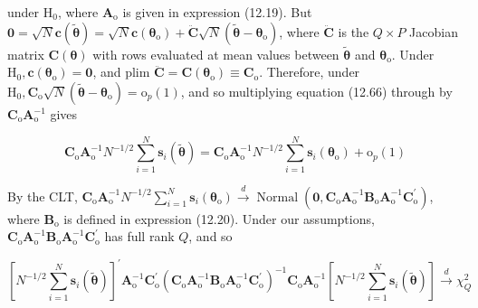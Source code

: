 \documentclass[10pt]{article}
\begin{document}
under $\mathrm{H}_{0}$, where $\mathbf{A}_{\mathrm{o}}$ is given in expression (12.19). But $\mathbf{0}=\sqrt{N} \mathbf{c}(\tilde{\boldsymbol{\theta}})=\sqrt{N} \mathbf{c}\left(\boldsymbol{\theta}_{\mathrm{o}}\right)+ \ddot{\mathbf{C}} \sqrt{N}\left(\tilde{\boldsymbol{\theta}}-\boldsymbol{\theta}_{\mathrm{o}}\right)$, where $\ddot{\mathbf{C}}$ is the $Q \times P$ Jacobian matrix $\mathbf{C}(\boldsymbol{\theta})$ with rows evaluated at mean values between $\tilde{\boldsymbol{\theta}}$ and $\boldsymbol{\theta}_{\mathrm{o}}$. Under $\mathrm{H}_{0}, \mathbf{c}\left(\boldsymbol{\theta}_{\mathrm{o}}\right)=\mathbf{0}$, and plim $\ddot{\mathbf{C}}=\mathbf{C}\left(\boldsymbol{\theta}_{\mathrm{o}}\right) \equiv \mathbf{C}_{\mathrm{o}}$. Therefore, under $\mathrm{H}_{0}, \mathbf{C}_{\mathrm{o}} \sqrt{N}\left(\tilde{\boldsymbol{\theta}}-\boldsymbol{\theta}_{\mathrm{o}}\right)=\mathrm{o}_{p}(1)$, and so multiplying equation (12.66) through by $\mathbf{C}_{\mathrm{o}} \mathbf{A}_{\mathrm{o}}^{-1}$ gives


\begin{equation*}
\mathbf{C}_{\mathrm{o}} \mathbf{A}_{\mathrm{o}}^{-1} N^{-1 / 2} \sum_{i=1}^{N} \mathbf{s}_{i}(\tilde{\boldsymbol{\theta}})=\mathbf{C}_{\mathrm{o}} \mathbf{A}_{\mathrm{o}}^{-1} N^{-1 / 2} \sum_{i=1}^{N} \mathbf{s}_{i}\left(\boldsymbol{\theta}_{\mathrm{o}}\right)+\mathrm{o}_{p}(1) \tag{12.67}
\end{equation*}


By the CLT, $\mathbf{C}_{\mathrm{o}} \mathbf{A}_{\mathrm{o}}^{-1} N^{-1 / 2} \sum_{i=1}^{N} \mathbf{s}_{i}\left(\boldsymbol{\theta}_{\mathrm{o}}\right) \xrightarrow{d} \operatorname{Normal}\left(\mathbf{0}, \mathbf{C}_{\mathrm{o}} \mathbf{A}_{\mathrm{o}}^{-1} \mathbf{B}_{\mathrm{o}} \mathbf{A}_{\mathrm{o}}^{-1} \mathbf{C}_{\mathrm{o}}^{\prime}\right)$, where $\mathbf{B}_{\mathrm{o}}$ is defined in expression (12.20). Under our assumptions, $\mathbf{C}_{\mathrm{o}} \mathbf{A}_{\mathrm{o}}^{-1} \mathbf{B}_{\mathrm{o}} \mathbf{A}_{\mathrm{o}}^{-1} \mathbf{C}_{\mathrm{o}}^{\prime}$ has full rank $Q$, and so

$$
\left[N^{-1 / 2} \sum_{i=1}^{N} \mathbf{s}_{i}(\tilde{\boldsymbol{\theta}})\right]^{\prime} \mathbf{A}_{\mathrm{o}}^{-1} \mathbf{C}_{\mathrm{o}}^{\prime}\left(\mathbf{C}_{\mathrm{o}} \mathbf{A}_{\mathrm{o}}^{-1} \mathbf{B}_{\mathrm{o}} \mathbf{A}_{\mathrm{o}}^{-1} \mathbf{C}_{\mathrm{o}}^{\prime}\right)^{-1} \mathbf{C}_{\mathrm{o}} \mathbf{A}_{\mathrm{o}}^{-1}\left[N^{-1 / 2} \sum_{i=1}^{N} \mathbf{s}_{i}(\tilde{\boldsymbol{\theta}})\right] \xrightarrow{d} \chi_{Q}^{2}
$$
\end{document}
